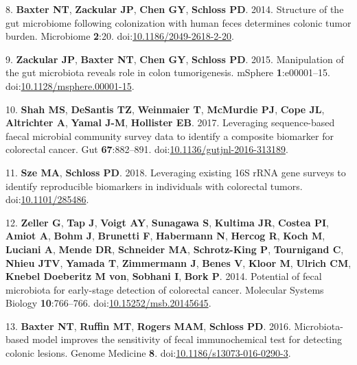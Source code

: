 \documentclass[11pt,]{article}
\begin{document}
\hypertarget{ref-Baxter2014}{}
8. \textbf{Baxter NT}, \textbf{Zackular JP}, \textbf{Chen GY},
\textbf{Schloss PD}. 2014. Structure of the gut microbiome following
colonization with human feces determines colonic tumor burden.
Microbiome \textbf{2}:20.
doi:\href{https://doi.org/10.1186/2049-2618-2-20}{10.1186/2049-2618-2-20}.

\hypertarget{ref-Zackular2015}{}
9. \textbf{Zackular JP}, \textbf{Baxter NT}, \textbf{Chen GY},
\textbf{Schloss PD}. 2015. Manipulation of the gut microbiota reveals
role in colon tumorigenesis. mSphere \textbf{1}:e00001--15.
doi:\href{https://doi.org/10.1128/msphere.00001-15}{10.1128/msphere.00001-15}.

\hypertarget{ref-Shah2017}{}
10. \textbf{Shah MS}, \textbf{DeSantis TZ}, \textbf{Weinmaier T},
\textbf{McMurdie PJ}, \textbf{Cope JL}, \textbf{Altrichter A},
\textbf{Yamal J-M}, \textbf{Hollister EB}. 2017. Leveraging
sequence-based faecal microbial community survey data to identify a
composite biomarker for colorectal cancer. Gut \textbf{67}:882--891.
doi:\href{https://doi.org/10.1136/gutjnl-2016-313189}{10.1136/gutjnl-2016-313189}.

\hypertarget{ref-meta_analysis_crc_Sze2018}{}
11. \textbf{Sze MA}, \textbf{Schloss PD}. 2018. Leveraging existing 16S
rRNA gene surveys to identify reproducible biomarkers in individuals
with colorectal tumors.
doi:\href{https://doi.org/10.1101/285486}{10.1101/285486}.

\hypertarget{ref-Zeller2014}{}
12. \textbf{Zeller G}, \textbf{Tap J}, \textbf{Voigt AY},
\textbf{Sunagawa S}, \textbf{Kultima JR}, \textbf{Costea PI},
\textbf{Amiot A}, \textbf{Bohm J}, \textbf{Brunetti F},
\textbf{Habermann N}, \textbf{Hercog R}, \textbf{Koch M},
\textbf{Luciani A}, \textbf{Mende DR}, \textbf{Schneider MA},
\textbf{Schrotz-King P}, \textbf{Tournigand C}, \textbf{Nhieu JTV},
\textbf{Yamada T}, \textbf{Zimmermann J}, \textbf{Benes V},
\textbf{Kloor M}, \textbf{Ulrich CM}, \textbf{Knebel Doeberitz M von},
\textbf{Sobhani I}, \textbf{Bork P}. 2014. Potential of fecal microbiota
for early-stage detection of colorectal cancer. Molecular Systems
Biology \textbf{10}:766--766.
doi:\href{https://doi.org/10.15252/msb.20145645}{10.15252/msb.20145645}.

\hypertarget{ref-Baxter2016}{}
13. \textbf{Baxter NT}, \textbf{Ruffin MT}, \textbf{Rogers MAM},
\textbf{Schloss PD}. 2016. Microbiota-based model improves the
sensitivity of fecal immunochemical test for detecting colonic lesions.
Genome Medicine \textbf{8}.
doi:\href{https://doi.org/10.1186/s13073-016-0290-3}{10.1186/s13073-016-0290-3}.
\end{document}
